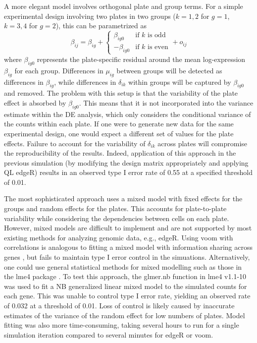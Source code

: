 \documentclass{article}
\begin{document}
A more elegant model involves orthogonal plate and group terms.
For a simple experimental design involving two plates in two groups ($k=1,2$ for $g=1$, $k=3,4$ for $g=2$), this can be parametrized as
\[
    \beta_{ij} = \beta_{ig} + 
    \begin{cases} 
        \beta_{ig0} & \mbox{if $k$ is odd} \\
        - \beta_{ig0} & \mbox{if $k$ is even}
    \end{cases}
    + o_{ij}
\]
where $\beta_{ig0}$ represents the plate-specific residual around the mean log-expression $\beta_{ig}$ for each group.
Differences in $\mu_{ig}$ between groups will be detected as differences in $\beta_{ig}$, 
    while differences in $\delta_{ik}$ within groups will be captured by $\beta_{ig0}$ and removed.
The problem with this setup is that the variability of the plate effect is absorbed by $\beta_{ig0}$.
This means that it is not incorporated into the variance estimate within the DE analysis, which only considers the conditional variance of the counts within each plate.
If one were to generate new data for the same experimental design, one would expect a different set of values for the plate effects.
Failure to account for the variability of $\delta_{ik}$ across plates will compromise the reproducibility of the results.
Indeed, application of this approach in the previous simulation (by modifying the design matrix appropriately and applying QL edgeR)
    results in an observed type I error rate of 0.55 at a specified threshold of 0.01.

The most sophisticated approach uses a mixed model with fixed effects for the groups and random effects for the plates.
This accounts for plate-to-plate variability while considering the dependencies between cells on each plate.
However, mixed models are difficult to implement and are not supported by most existing methods for analyzing genomic data, e.g., edgeR.
Using voom with correlations is analogous to fitting a mixed model with information sharing across genes \cite{smyth2005limma}, 
    but fails to maintain type I error control in the simuations.
Alternatively, one could use general statistical methods for mixed modelling such as those in the lme4 package \cite{bates2015fitting}.
To test this approach, the glmer.nb function in lme4 v1.1-10 was used to fit a NB generalized linear mixed model to the simulated counts for each gene.
This was unable to control type I error rate, yielding an observed rate of 0.032 at a threshold of 0.01.
Loss of control is likely caused by inaccurate estimates of the variance of the random effect for low numbers of plates.
Model fitting was also more time-consuming, taking several hours to run for a single simulation iteration compared to several minutes for edgeR or voom.
\end{document}
